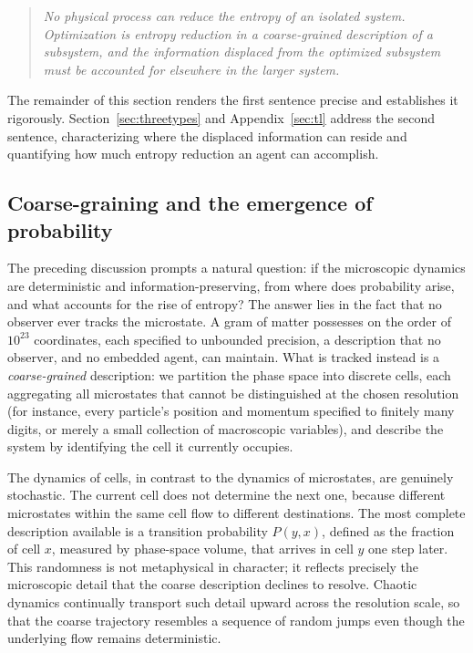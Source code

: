 \documentclass[10pt]{article}
\theoremstyle{definition}
\theoremstyle{remark}
\begin{document}
\begin{quote}
\emph{No physical process can reduce the entropy of an isolated system. Optimization is entropy reduction in a coarse-grained description of a subsystem, and the information displaced from the optimized subsystem must be accounted for elsewhere in the larger system.}
\end{quote}

The remainder of this section renders the first sentence precise and establishes it rigorously. Section~\ref{sec:threetypes} and Appendix~\ref{sec:tl} address the second sentence, characterizing where the displaced information can reside and quantifying how much entropy reduction an agent can accomplish.

\subsection{Coarse-graining and the emergence of probability}
\label{sec:coarse}

The preceding discussion prompts a natural question: if the microscopic dynamics are deterministic and information-preserving, from where does probability arise, and what accounts for the rise of entropy? The answer lies in the fact that no observer ever tracks the microstate. A gram of matter possesses on the order of $10^{23}$ coordinates, each specified to unbounded precision, a description that no observer, and no embedded agent, can maintain. What is tracked instead is a \emph{coarse-grained} description: we partition the phase space into discrete cells, each aggregating all microstates that cannot be distinguished at the chosen resolution (for instance, every particle's position and momentum specified to finitely many digits, or merely a small collection of macroscopic variables), and describe the system by identifying the cell it currently occupies.

The dynamics of cells, in contrast to the dynamics of microstates, are genuinely stochastic. The current cell does not determine the next one, because different microstates within the same cell flow to different destinations. The most complete description available is a transition probability $P(y, x)$, defined as the fraction of cell $x$, measured by phase-space volume, that arrives in cell $y$ one step later. This randomness is not metaphysical in character; it reflects precisely the microscopic detail that the coarse description declines to resolve. Chaotic dynamics continually transport such detail upward across the resolution scale, so that the coarse trajectory resembles a sequence of random jumps even though the underlying flow remains deterministic.
\end{document}
